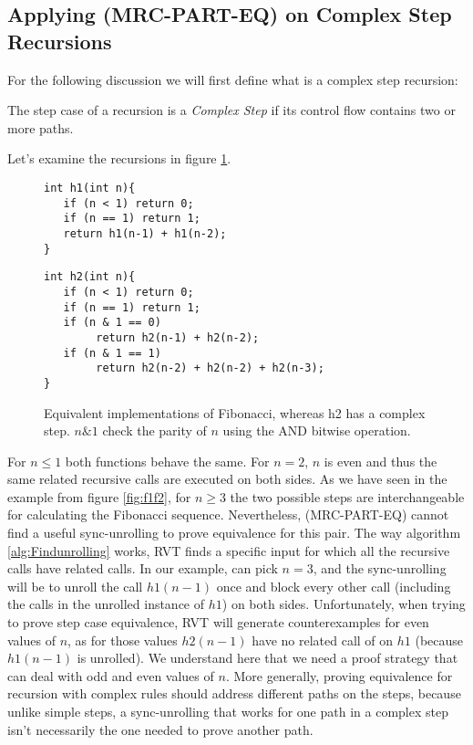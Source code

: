 \subsection{Applying (MRC-PART-EQ) on Complex Step Recursions}
For the following discussion we will first define what is a complex step recursion:
\begin{definition}
The step case of a recursion is a \emph{Complex Step} if its control flow contains two or more paths.
\end{definition}
Let's examine the recursions in figure \ref{fig:f1f2cond}.
\begin{figure}[h]
\begin{center}
\begin{minipage}{7 cm}
\begin{lstlisting}
int h1(int n){
   if (n < 1) return 0;
   if (n == 1) return 1; 
   return h1(n-1) + h1(n-2);
}
\end{lstlisting}
\end{minipage}
\begin{minipage}{7 cm}
\begin{lstlisting}
int h2(int n){
   if (n < 1) return 0;
   if (n == 1) return 1; 
   if (n & 1 == 0)
        return h2(n-1) + h2(n-2);
   if (n & 1 == 1)
        return h2(n-2) + h2(n-2) + h2(n-3);
}
\end{lstlisting}
\end{minipage}
\caption{Equivalent implementations of Fibonacci, whereas h2 has a complex step. $n \& 1$ check the parity of $n$ using the AND bitwise operation.}
\label{fig:f1f2cond}
\end{center}
\end{figure}
For $n\leq 1$ both functions behave the same. For $n=2$, $n$ is even and thus the same related recursive calls are executed on both sides. As we have seen in the example from figure \ref{fig:f1f2}, for $n\geq3$ the two possible steps are interchangeable for calculating the Fibonacci sequence. Nevertheless, (MRC-PART-EQ) cannot find a useful sync-unrolling to prove equivalence for this pair. The way algorithm \ref{alg:Findunrolling} works, RVT finds a specific input for which all the recursive calls have related calls. In our example,  can pick $n=3$, and the sync-unrolling will be to unroll the call $h1(n-1)$ once and block every other call (including the calls in the unrolled instance of $h1$) on both sides. Unfortunately, when trying to prove step case equivalence, RVT will generate counterexamples for even values of $n$, as for those values $h2(n-1)$ have no related call of on $h1$ (because $h1(n-1)$ is unrolled). We understand here that we need a proof strategy that can deal with odd and even values of $n$. More generally, proving equivalence for recursion with complex rules should address different paths on the steps, because unlike simple steps, a sync-unrolling that works for one path in a complex step isn't necessarily the one needed to prove another path.

